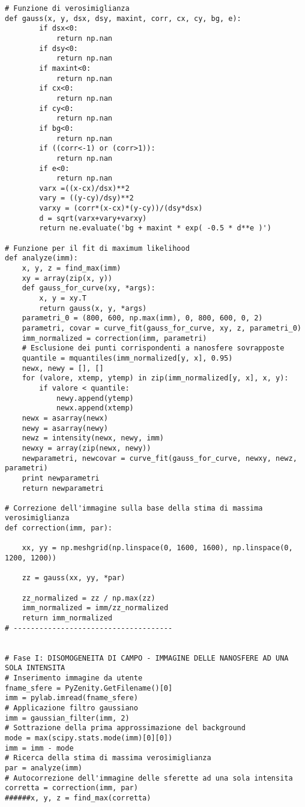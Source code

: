 \begin{lstlisting}
# Funzione di verosimiglianza 
def gauss(x, y, dsx, dsy, maxint, corr, cx, cy, bg, e):
        if dsx<0:
            return np.nan
        if dsy<0:
            return np.nan
        if maxint<0:
            return np.nan
        if cx<0:
            return np.nan
        if cy<0:
            return np.nan
        if bg<0: 
            return np.nan
        if ((corr<-1) or (corr>1)):
            return np.nan
        if e<0:
            return np.nan
        varx =((x-cx)/dsx)**2
        vary = ((y-cy)/dsy)**2
        varxy = (corr*(x-cx)*(y-cy))/(dsy*dsx)
        d = sqrt(varx+vary+varxy)
        return ne.evaluate('bg + maxint * exp( -0.5 * d**e )')
        
# Funzione per il fit di maximum likelihood
def analyze(imm):
    x, y, z = find_max(imm)
    xy = array(zip(x, y))
    def gauss_for_curve(xy, *args):
        x, y = xy.T
        return gauss(x, y, *args)
    parametri_0 = (800, 600, np.max(imm), 0, 800, 600, 0, 2)
    parametri, covar = curve_fit(gauss_for_curve, xy, z, parametri_0)
    imm_normalized = correction(imm, parametri)
    # Esclusione dei punti corrispondenti a nanosfere sovrapposte
    quantile = mquantiles(imm_normalized[y, x], 0.95)
    newx, newy = [], []
    for (valore, xtemp, ytemp) in zip(imm_normalized[y, x], x, y):
        if valore < quantile:
            newy.append(ytemp) 
            newx.append(xtemp)
    newx = asarray(newx) 
    newy = asarray(newy)
    newz = intensity(newx, newy, imm)
    newxy = array(zip(newx, newy))
    newparametri, newcovar = curve_fit(gauss_for_curve, newxy, newz, parametri)
    print newparametri
    return newparametri

# Correzione dell'immagine sulla base della stima di massima verosimiglianza
def correction(imm, par):

    xx, yy = np.meshgrid(np.linspace(0, 1600, 1600), np.linspace(0, 1200, 1200))
    
    zz = gauss(xx, yy, *par)
    
    zz_normalized = zz / np.max(zz)
    imm_normalized = imm/zz_normalized
    return imm_normalized 
# -------------------------------------


# Fase I: DISOMOGENEITA DI CAMPO - IMMAGINE DELLE NANOSFERE AD UNA SOLA INTENSITA
# Inserimento immagine da utente
fname_sfere = PyZenity.GetFilename()[0]
imm = pylab.imread(fname_sfere)
# Applicazione filtro gaussiano
imm = gaussian_filter(imm, 2)
# Sottrazione della prima approssimazione del background
mode = max(scipy.stats.mode(imm)[0][0])
imm = imm - mode
# Ricerca della stima di massima verosimiglianza
par = analyze(imm)
# Autocorrezione dell'immagine delle sferette ad una sola intensita
corretta = correction(imm, par)
######x, y, z = find_max(corretta)



\end{lstlisting}

